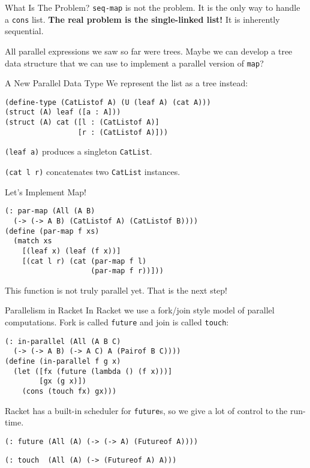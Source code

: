 \documentclass{beamer}
\begin{document}
\begin{frame}{What Is The Problem?}
  \lstinline{seq-map} is not the problem. It is the only way to handle a \lstinline{cons} list. \textbf{The real problem is the single-linked list!} It is inherently sequential.

\pause{} \vspace{1cm}

All parallel expressions we saw so far were trees. Maybe we can develop a tree data structure that we can use to implement a parallel version of \lstinline{map}?
\end{frame}

\begin{frame}[fragile]{A New Parallel Data Type}
We represent the list as a tree instead:
\begin{lstlisting}
(define-type (CatListof A) (U (leaf A) (cat A)))
(struct (A) leaf ([a : A]))
(struct (A) cat ([l : (CatListof A)]
                 [r : (CatListof A)]))
\end{lstlisting}

\pause{} \vspace{.5cm}

\lstinline{(leaf a)} produces a singleton \lstinline{CatList}.

\lstinline{(cat l r)} concatenates two \lstinline{CatList} instances.
\end{frame}

\begin{frame}[fragile]{Let's Implement Map!}
\begin{lstlisting}
(: par-map (All (A B)
  (-> (-> A B) (CatListof A) (CatListof B))))
(define (par-map f xs)
  (match xs
    [(leaf x) (leaf (f x))]
    [(cat l r) (cat (par-map f l)
                    (par-map f r))]))
\end{lstlisting}

This function is not truly parallel yet. That is the next step!

\end{frame}

\begin{frame}[fragile]{Parallelism in Racket}
In Racket we use a fork/join style model of parallel computations. Fork is called \lstinline{future} and join is called \lstinline{touch}:

\begin{lstlisting}
(: in-parallel (All (A B C)
  (-> (-> A B) (-> A C) A (Pairof B C))))
(define (in-parallel f g x)
  (let ([fx (future (lambda () (f x)))]
        [gx (g x)])
    (cons (touch fx) gx)))
\end{lstlisting}

\pause{} \vspace{.5cm}

Racket has a built-in scheduler for \lstinline{future}s, so we give a lot of control to the run-time.

\lstinline{(: future (All (A) (-> (-> A) (Futureof A))))}

\lstinline{(: touch  (All (A) (-> (Futureof A) A)))}
\end{frame}
\end{document}
